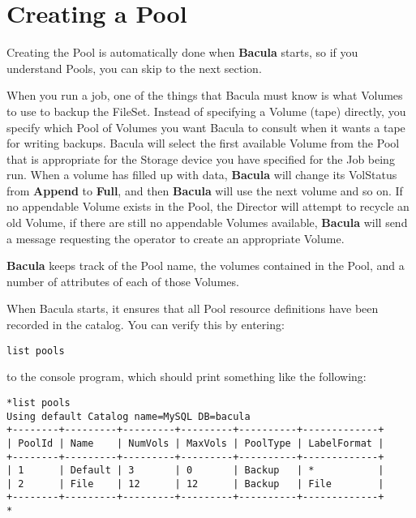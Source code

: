 \section{Creating a Pool}
\label{Pool}

Creating the Pool is automatically done when {\bf Bacula} starts, so if you
understand Pools, you can skip to the next section. 

When you run a job, one of the things that Bacula must know is what Volumes to
use to backup the FileSet. Instead of specifying a Volume (tape) directly, you
specify which Pool of Volumes you want Bacula to consult when it wants a tape
for writing backups. Bacula will select the first available Volume from the
Pool that is appropriate for the Storage device you have specified for the Job
being run. When a volume has filled up with data, {\bf Bacula} will change its
VolStatus from {\bf Append} to {\bf Full}, and then {\bf Bacula} will use the
next volume and so on. If no appendable Volume exists in the Pool, the
Director will attempt to recycle an old Volume, if there are still no
appendable Volumes available, {\bf Bacula} will send a message requesting the
operator to create an appropriate Volume. 

{\bf Bacula} keeps track of the Pool name, the volumes contained in the Pool,
and a number of attributes of each of those Volumes. 

When Bacula starts, it ensures that all Pool resource definitions have been
recorded in the catalog. You can verify this by entering: 

\footnotesize
\begin{verbatim}
list pools
\end{verbatim}
\normalsize

to the console program, which should print something like the following: 

\footnotesize
\begin{verbatim}
*list pools
Using default Catalog name=MySQL DB=bacula
+--------+---------+---------+---------+----------+-------------+
| PoolId | Name    | NumVols | MaxVols | PoolType | LabelFormat |
+--------+---------+---------+---------+----------+-------------+
| 1      | Default | 3       | 0       | Backup   | *           |
| 2      | File    | 12      | 12      | Backup   | File        |
+--------+---------+---------+---------+----------+-------------+
*
\end{verbatim}
\normalsize

